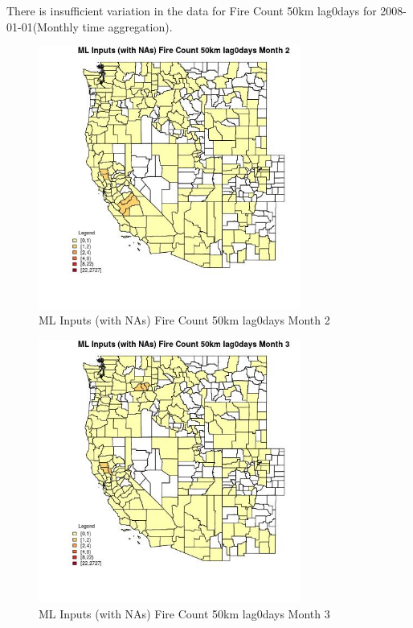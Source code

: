 There is insufficient variation in the data for Fire Count 50km lag0days for 2008-01-01(Monthly time aggregation). 
 

\begin{figure} 
\centering  
\includegraphics[width=0.77\textwidth]{Code_Outputs/Report_ML_input_PM25_Step4_part_f_de_duplicated_aveswNAs_CountyFire_Count_50km_lag0daysmedianMonth2.jpg} 
\caption{\label{fig:Report_ML_input_PM25_Step4_part_f_de_duplicated_aveswNAsCountyFire_Count_50km_lag0daysmedianMonth2}ML Inputs (with NAs) Fire Count 50km lag0days Month 2} 
\end{figure} 
 

\begin{figure} 
\centering  
\includegraphics[width=0.77\textwidth]{Code_Outputs/Report_ML_input_PM25_Step4_part_f_de_duplicated_aveswNAs_CountyFire_Count_50km_lag0daysmedianMonth3.jpg} 
\caption{\label{fig:Report_ML_input_PM25_Step4_part_f_de_duplicated_aveswNAsCountyFire_Count_50km_lag0daysmedianMonth3}ML Inputs (with NAs) Fire Count 50km lag0days Month 3} 
\end{figure} 
 

